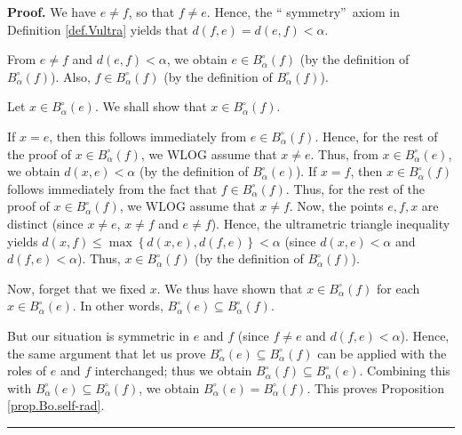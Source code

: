 \documentclass[numbers=enddot,12pt,final,onecolumn,notitlepage]{scrartcl}%
\theoremstyle{definition}
\newenvironment{proof}[1][Proof]{\noindent\textbf{#1.} }{\ \rule{0.5em}{0.5em}}
\renewcommand{\leq}{\leqslant}
\theoremstyle{plainsl}
\begin{document}
\begin{proof}
We have $e\neq f$, so that $f\neq e$. Hence, the \textquotedblleft
symmetry\textquotedblright\ axiom in Definition \ref{def.Vultra} yields that
$d\left(  f,e\right)  =d\left(  e,f\right)  <\alpha$.

From $e\neq f$ and $d\left(  e,f\right)  <\alpha$, we obtain $e\in B_{\alpha
}^{\circ}\left(  f\right)  $ (by the definition of $B_{\alpha}^{\circ}\left(
f\right)  $). Also, $f\in B_{\alpha}^{\circ}\left(  f\right)  $ (by the
definition of $B_{\alpha}^{\circ}\left(  f\right)  $).

Let $x\in B_{\alpha}^{\circ}\left(  e\right)  $. We shall show that $x\in
B_{\alpha}^{\circ}\left(  f\right)  $.

If $x=e$, then this follows immediately from $e\in B_{\alpha}^{\circ}\left(
f\right)  $. Hence, for the rest of the proof of $x\in B_{\alpha}^{\circ
}\left(  f\right)  $, we WLOG assume that $x\neq e$. Thus, from $x\in
B_{\alpha}^{\circ}\left(  e\right)  $, we obtain $d\left(  x,e\right)
<\alpha$ (by the definition of $B_{\alpha}^{\circ}\left(  e\right)  $). If
$x=f$, then $x\in B_{\alpha}^{\circ}\left(  f\right)  $ follows immediately
from the fact that $f\in B_{\alpha}^{\circ}\left(  f\right)  $. Thus, for the
rest of the proof of $x\in B_{\alpha}^{\circ}\left(  f\right)  $, we WLOG
assume that $x\neq f$. Now, the points $e,f,x$ are distinct (since $x\neq e$,
$x\neq f$ and $e\neq f$). Hence, the ultrametric triangle inequality yields
$d\left(  x,f\right)  \leq\max\left\{  d\left(  x,e\right)  ,d\left(
f,e\right)  \right\}  <\alpha$ (since $d\left(  x,e\right)  <\alpha$ and
$d\left(  f,e\right)  <\alpha$). Thus, $x\in B_{\alpha}^{\circ}\left(
f\right)  $ (by the definition of $B_{\alpha}^{\circ}\left(  f\right)  $).

Now, forget that we fixed $x$. We thus have shown that $x\in B_{\alpha}%
^{\circ}\left(  f\right)  $ for each $x\in B_{\alpha}^{\circ}\left(  e\right)
$. In other words, $B_{\alpha}^{\circ}\left(  e\right)  \subseteq B_{\alpha
}^{\circ}\left(  f\right)  $.

But our situation is symmetric in $e$ and $f$ (since $f\neq e$ and $d\left(
f,e\right)  <\alpha$). Hence, the same argument that let us prove $B_{\alpha
}^{\circ}\left(  e\right)  \subseteq B_{\alpha}^{\circ}\left(  f\right)  $ can
be applied with the roles of $e$ and $f$ interchanged; thus we obtain
$B_{\alpha}^{\circ}\left(  f\right)  \subseteq B_{\alpha}^{\circ}\left(
e\right)  $. Combining this with $B_{\alpha}^{\circ}\left(  e\right)
\subseteq B_{\alpha}^{\circ}\left(  f\right)  $, we obtain $B_{\alpha}^{\circ
}\left(  e\right)  =B_{\alpha}^{\circ}\left(  f\right)  $. This proves
Proposition \ref{prop.Bo.self-rad}.
\end{proof}
\end{document}
